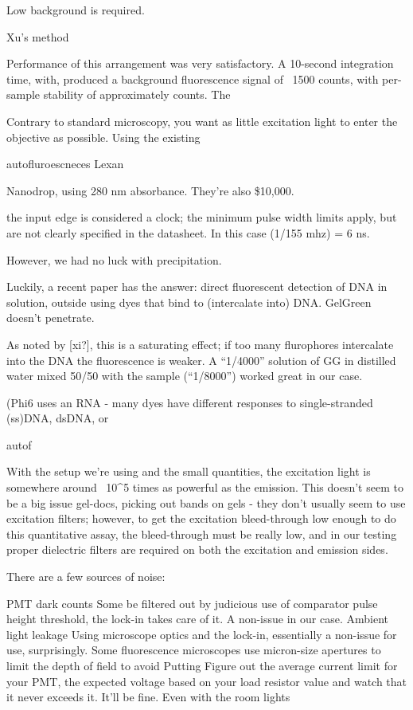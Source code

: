 \documentclass[paper.tex]{subfiles}
\begin{document}
Low background is required.

Xu's method \cite{Quantification2020}

Performance of this arrangement was very satisfactory. A 10-second integration time, with, produced a background fluorescence signal of ~1500 counts, with per-sample stability of approximately  counts. The  



Contrary to standard microscopy, you want as little excitation light to enter the objective as possible. Using the existing 

autofluroescneces Lexan

Nanodrop, using 280 nm absorbance. They're also \$10,000.




the input edge is considered a clock; the minimum pulse width limits apply, but are not clearly specified in the datasheet. In this case (1/155 mhz) = 6 ns.

However, we had no luck with precipitation.


Luckily, a recent paper has the answer: direct fluorescent detection of DNA in solution, outside using dyes that bind to (intercalate into) DNA. GelGreen doesn’t penetrate.



As noted by [xi?], this is a saturating effect; if too many flurophores intercalate into the DNA the fluorescence is weaker. A “1/4000” solution of GG in distilled water mixed 50/50 with the sample (“1/8000”) worked great in our case.

(Phi6 uses an RNA - many dyes have different responses to single-stranded (ss)DNA, dsDNA, or 


autof


With the setup we’re using and the small quantities, the excitation light is somewhere around ~10^5 times as powerful as the emission. This doesn’t seem to be a big issue gel-docs, picking out bands on gels - they don’t usually seem to use excitation filters; however, to get the excitation bleed-through low enough to do this quantitative assay, the bleed-through must be really low, and in our testing proper dielectric filters are required on both the excitation and emission sides. 

There are a few sources of noise:

PMT dark counts
Some be filtered out by judicious use of comparator pulse height threshold, the lock-in takes care of it. A non-issue in our case.
Ambient light leakage
Using microscope optics and the lock-in, essentially a non-issue for use, surprisingly. Some fluorescence microscopes use micron-size apertures to limit the depth of field to avoid Putting 
Figure out the average current limit for your PMT, the expected voltage based on your load resistor value and watch that it never exceeds it. It’ll be fine. Even with the room lights
\end{document}
